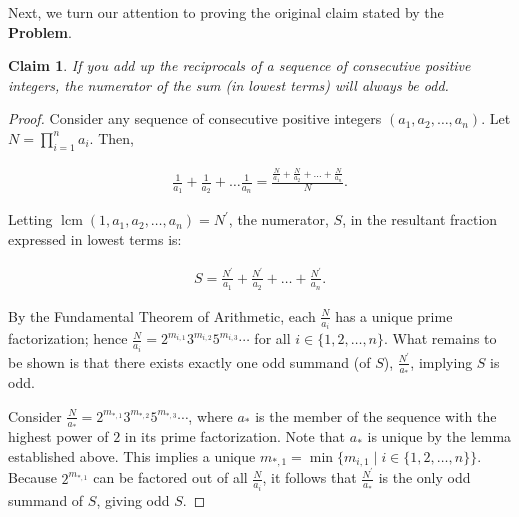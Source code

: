 \documentclass{article}
\newtheorem*{claim}{Claim}
\DeclareMathOperator{\lcm}{lcm}
\begin{document}
Next, we turn our attention to proving the original claim stated by the \textbf{Problem}.

\begin{claim}
  If you add up the reciprocals of a sequence of consecutive positive integers, the numerator of the sum (in lowest terms) will always be odd.
\end{claim}


\begin{proof}

  Consider any sequence of consecutive positive integers $(a_{1}, a_{2}, \ldots, a_{n})$.
  Let $N = \prod_{i=1}^{n} a_{i}$. Then, 

  \begin{align*}
    \frac{1}{a_1} + \frac{1}{a_2} + \ldots \frac{1}{a_n} = \frac{\frac{N}{a_1} + \frac{N}{a_2} + \ldots + \frac{N}{a_n}}{N}.
  \end{align*}

  Letting $\lcm(1, a_{1}, a_{2}, \ldots, a_{n}) = N^{\prime}$, the numerator, $S$, in the resultant fraction expressed in lowest terms is:

  \begin{align*}
    S = \frac{N^{\prime}}{a_1} + \frac{N^{\prime}}{a_2} + \ldots + \frac{N^{\prime}}{a_n}.
  \end{align*}

  By the Fundamental Theorem of Arithmetic, each $\frac{N}{a_i}$ has a unique prime factorization; hence $\frac{N}{a_i} = 2^{m_{i,1}}3^{m_{i,2}}5^{m_{i,3}}\cdots$ for all $i \in \lbrace 1, 2, \ldots, n \rbrace$.
  What remains to be shown is that there exists exactly one odd summand (of $S$), $\frac{N^{\prime}}{a_{*}}$, implying $S$ is odd.

  Consider $\frac{N}{a_{*}} = 2^{m_{*,1}}3^{m_{*,2}}5^{m_{*,3}}\cdots$, where $a_{*}$ is the member of the sequence with the highest power of $2$ in its prime factorization. Note that $a_{*}$ is unique by the lemma established above.
  This implies a unique $m_{*,1} = \min \lbrace m_{i, 1} \mid i \in \lbrace 1, 2, \ldots, n \rbrace \rbrace$.
  Because $2^{m_{*,1}}$ can be factored out of all $\frac{N}{a_{i}}$, it follows that $\frac{N^{\prime}}{a_{*}}$ is the only odd summand of $S$, giving odd $S$.

\end{proof}
\end{document}
